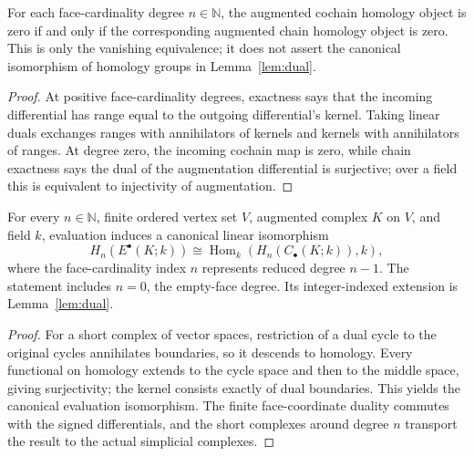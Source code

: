 \begin{lemma}\label{lem:dual-vanishing}
For each face-cardinality degree $n\in\mathbb N$, the augmented cochain
homology object is zero if and only if the corresponding augmented chain
homology object is zero. This is only the vanishing equivalence; it does not
assert the canonical isomorphism of homology groups in
Lemma~\ref{lem:dual}.
\leanok
\end{lemma}
\begin{proof}
At positive face-cardinality degrees, exactness says that the incoming
differential has range equal to the outgoing differential's kernel. Taking
linear duals exchanges ranges with annihilators of kernels and kernels with
annihilators of ranges. At degree zero, the incoming cochain map is zero,
while chain exactness says the dual of the augmentation differential is
surjective; over a field this is equivalent to injectivity of augmentation.
\end{proof}

\begin{lemma}\label{lem:dual-isomorphism}
For every $n\in\mathbb N$, finite ordered vertex set $V$, augmented
complex $K$ on $V$, and field $k$, evaluation induces a canonical linear
isomorphism
\[
 H_n(E^\bullet(K;k))\cong
 \operatorname{Hom}_k(H_n(C_\bullet(K;k)),k),
\]
where the face-cardinality index $n$ represents reduced degree $n-1$.
The statement includes $n=0$, the empty-face degree. Its integer-indexed
extension is Lemma~\ref{lem:dual}.
\leanok
\end{lemma}
\begin{proof}
For a short complex of vector spaces, restriction of a dual cycle to the
original cycles annihilates boundaries, so it descends to homology. Every
functional on homology extends to the cycle space and then to the middle
space, giving surjectivity; the kernel consists exactly of dual boundaries.
This yields the canonical evaluation isomorphism. The finite face-coordinate
duality commutes with the signed differentials, and the short complexes
around degree $n$ transport the result to the actual simplicial complexes.
\end{proof}

